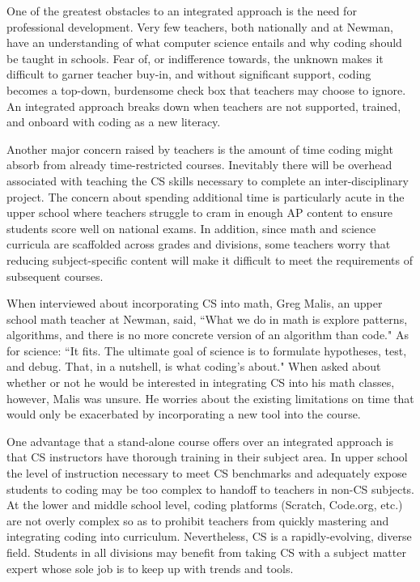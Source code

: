 One of the greatest obstacles to an integrated approach is the need for professional development. Very few teachers, both nationally and at Newman, have an understanding of what computer science entails and why coding should be taught in schools. Fear of, or indifference towards, the unknown makes it difficult to garner teacher buy-in, and without significant support, coding becomes a top-down, burdensome check box that teachers may choose to ignore. An integrated approach breaks down when teachers are not supported, trained, and onboard with coding as a new literacy. \par
Another major concern raised by teachers is the amount of time coding might absorb from already time-restricted courses. Inevitably there will be overhead associated with teaching the CS skills necessary to complete an inter-disciplinary project. The concern about spending additional time is particularly acute in the upper school where teachers struggle to cram in enough AP content to ensure students score well on national exams. In addition, since math and science curricula are scaffolded across grades and divisions, some teachers worry that reducing subject-specific content will make it difficult to meet the requirements of subsequent courses. \par
When interviewed about incorporating CS into math, Greg Malis, an upper school math teacher at Newman, said, ``What we do in math is explore patterns, algorithms, and there is no more concrete version of an algorithm than code." As for science: ``It fits. The ultimate goal of science is to formulate hypotheses, test, and debug. That, in a nutshell, is what coding's about." When asked about whether or not he would be interested in integrating CS into his math classes, however, Malis was unsure. He worries about the existing limitations on time that would only be exacerbated by incorporating a new tool into the course.\par
One advantage that a stand-alone course offers over an integrated approach is that CS instructors have thorough training in their subject area. In upper school the level of instruction necessary to meet CS benchmarks and adequately expose students to coding may be too complex to handoff to teachers in non-CS subjects. At the lower and middle school level, coding platforms (Scratch, Code.org, etc.) are not overly complex so as to prohibit teachers from quickly mastering and integrating coding into curriculum. Nevertheless, CS is a rapidly-evolving, diverse field. Students in all divisions may benefit from taking CS with a subject matter expert whose sole job is to keep up with trends and tools. \par

